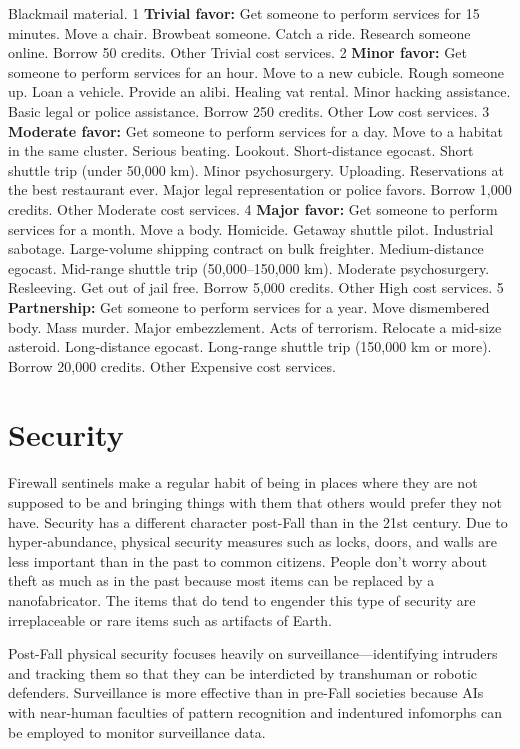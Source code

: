 Blackmail material.
1
\textbf{Trivial favor:} Get someone to perform services for 15 
minutes. Move a chair. Browbeat someone. Catch a ride. 
Research someone online. Borrow 50 credits. Other Trivial 
cost services.
2
\textbf{Minor favor:} Get someone to perform services for an 
hour. Move to a new cubicle. Rough someone up. Loan a 
vehicle. Provide an alibi. Healing vat rental. Minor hacking 
assistance. Basic legal or police assistance. Borrow 250 
credits. Other Low cost services.
3
\textbf{Moderate favor:} Get someone to perform services 
for a day. Move to a habitat in the same cluster. Serious 
beating. Lookout. Short-distance egocast. Short shuttle 
trip (under 50,000 km). Minor psychosurgery. Uploading. 
Reservations at the best restaurant ever. Major legal representation
or police favors. Borrow 1,000 credits. Other
Moderate cost services.
4
\textbf{Major favor:} Get someone to perform services for a 
month. Move a body. Homicide. Getaway shuttle pilot. 
Industrial sabotage. Large-volume shipping contract on 
bulk freighter. Medium-distance egocast. Mid-range shuttle 
trip (50,000–150,000 km). Moderate psychosurgery. 
Resleeving. Get out of jail free. Borrow 5,000 credits. Other 
High cost services.
5
\textbf{Partnership:} Get someone to perform services for a 
year. Move dismembered body. Mass murder. Major 
embezzlement. Acts of terrorism. Relocate a mid-size 
asteroid. Long-distance egocast. Long-range shuttle trip 
(150,000 km or more). Borrow 20,000 credits. Other 
Expensive cost services.

\section{Security}

Firewall sentinels make a regular habit of being in 
places where they are not supposed to be and bringing
things with them that others would prefer they
not have. Security has a different character post-Fall 
than in the 21st century. Due to hyper-abundance, 
physical security measures such as locks, doors, and 
walls are less important than in the past to common 
citizens. People don't worry about theft as much as 
in the past because most items can be replaced by a 
nanofabricator. The items that do tend to engender 
this type of security are irreplaceable or rare items 
such as artifacts of Earth.

Post-Fall physical security focuses heavily on 
surveillance—identifying intruders and tracking 
them so that they can be interdicted by transhuman 
or robotic defenders. Surveillance is more effective
than in pre-Fall societies because AIs with
near-human faculties of pattern recognition and 
indentured infomorphs can be employed to monitor 
surveillance data.

